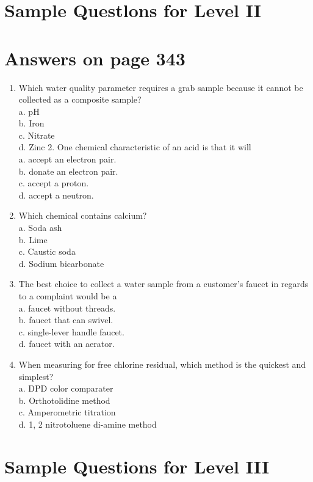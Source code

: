\documentclass[10pt]{article}
\begin{document}
\section{Sample Questlons for Level II}
\section{Answers on page 343}
\begin{enumerate}
  \item Which water quality parameter requires a grab sample because it cannot be collected as a composite sample?\\
a. $\mathrm{pH}$\\
b. Iron\\
c. Nitrate\\
d. Zinc 2. One chemical characteristic of an acid is that it will\\
a. accept an electron pair.\\
b. donate an electron pair.\\
c. accept a proton.\\
d. accept a neutron.

  \item Which chemical contains calcium?\\
a. Soda ash\\
b. Lime\\
c. Caustic soda\\
d. Sodium bicarbonate

  \item The best choice to collect a water sample from a customer's faucet in regards to a complaint would be a\\
a. faucet without threads.\\
b. faucet that can swivel.\\
c. single-lever handle faucet.\\
d. faucet with an aerator.

  \item When measuring for free chlorine residual, which method is the quickest and simplest?\\
a. DPD color comparater\\
b. Orthotolidine method\\
c. Amperometric titration\\
d. 1, 2 nitrotoluene di-amine method

\end{enumerate}

\section{Sample Questions for Level III}
\end{document}
